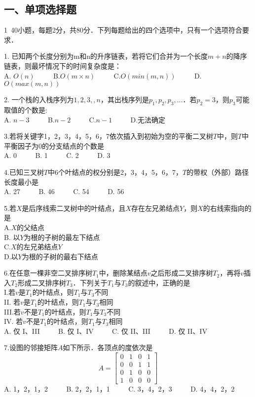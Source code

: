 
\subsection{一、单项选择题}
1~40小题，每题2分，共80分．下列每题给出的四个选项中，只有一个选项符合要求．

1. 已知两个长度分别为m和n的升序链表，若将它们合并为一个长度$m+n$的降序链表，则最坏情况下的时间复杂度是： \\
A. $O(n)$ $\qquad$ B.$O(m \times n)$ $\qquad$ C.$O(min(m,n))$ $\qquad$ D.$O(max(m,n))$

2. 一个栈的入栈序列为$1,2,3,,n$，其出栈序列是$p_1, p_2, p_3, ...$．若$p_2=3$，则$p_3$可能取值的个数是: \\
A. $n-3$  $\qquad$  B.$n-2$ $\qquad$ C.$n-1$ $\qquad$ D.无法确定

3.若将关键字1，2，3，4，5，6，7依次插入到初始为空的平衡二叉树$T$中，则$T$中平衡因子为0的分支结点的个数是 \\
   A. 0 $\qquad$ B. 1 $\qquad$ C. 2 $\qquad$ D. 3

4.已知三叉树$T$中6个叶结点的权分别是2，3，4，5，6，7，$T$的带权（外部）路径长度最小是 \\
   A. 27 $\qquad$ B. 46 $\qquad$ C. 54 $\qquad$ D. 56 

5.若$X$是后序线索二叉树中的叶结点，且$X$存在左兄弟结点$Y$，则$X$的右线索指向的是 \\
A.$X$的父结点 \\
B. 以$Y$为根的子树的最左下结点 \\
C.$X$的左兄弟结点$Y$ \\
D.以$Y$为根的子树的最右下结点

6.在任意一棵非空二叉排序树$T_1$中，删除某结点$v$之后形成二叉排序树$T_2$，再将$v$插入$T_2$形成二叉排序树$T_3$．下列关于$T_1$与$T_3$的叙述中，正确的是  \\
I.若$v$是$T_1$的叶结点，则$T_1$与$T_3$不同 \\
II.	若$v$是$T_1$的叶结点，则$T_1$与$T_3$相同 \\
III.若$v$不是$T_1$的叶结点，则$T_1$与$T_3$不同 \\
IV.	若$v$不是$T_1$的叶结点，则$T_1$与$T_3$相同 \\
A. 仅 I、III $\qquad$ B. 仅 I、IV $\qquad$ C. 仅 II、III $\qquad$ D. 仅 II、IV

7.设图的邻接矩阵$A$如下所示．各顶点的度依次是 \\
\begin{equation}
A=\begin{bmatrix}
0 & 1 & 0 & 1 \\
0 & 0 & 1 & 1 \\
0 & 1 & 0 & 0 \\
1 & 0 & 0 & 0
\end{bmatrix}
\end{equation}
A. 1，2，1，2 $\qquad$ B. 2，2，1，1 $\qquad$ C. 3，4，2，3 $\qquad$ D. 4，4，2，2

